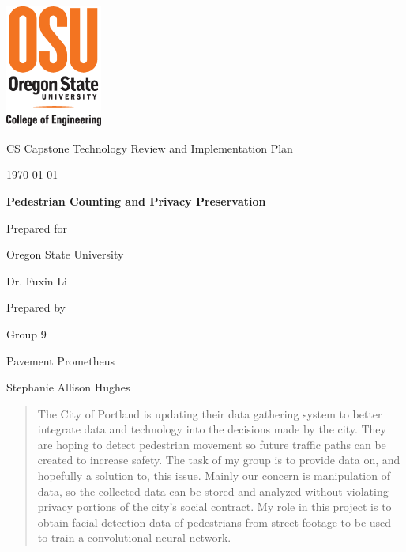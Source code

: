 \documentclass[onecolumn, draftclsnofoot,10pt, compsoc]{IEEEtran}
\def \CapstoneTeamName{		Pavement Prometheus}
\def \CapstoneTeamNumber{		9}
\def \GroupMemberOne{		Stephanie Allison Hughes }
\def \CapstoneProjectName{		Pedestrian Counting and Privacy Preservation}
\def \CapstoneSponsorCompany{	Oregon State University}
\def \CapstoneSponsorPerson{		Dr. Fuxin Li}
\def \DocType{		%
				Technology Review and Implementation Plan
				}
\newcommand{\NameSigPair}[1]{\par
\makebox[2.75in][r]{#1} \hfil 	\makebox[3.25in]{\makebox[2.25in]{\hrulefill} \hfill		\makebox[.75in]{\hrulefill}}
\par\vspace{-12pt} \textit{\tiny\noindent
\makebox[2.75in]{} \hfil		\makebox[3.25in]{\makebox[2.25in][r]{Signature} \hfill	\makebox[.75in][r]{Date}}}}
\renewcommand{\NameSigPair}[1]{#1}
\begin{document}
\begin{titlepage}
    \begin{singlespace}
    	\includegraphics[height=4cm]{images/coe_v_spot1}
        \hfill 
        \par\vspace{.2in}
        \centering
        \scshape{
            \huge CS Capstone \DocType \par
            {\large\today}\par
            \vspace{.5in}
            \textbf{\Huge\CapstoneProjectName}\par
            {\large Prepared for}\par
            \Huge \CapstoneSponsorCompany\par
            \vspace{5pt}
            {\Large\NameSigPair{\CapstoneSponsorPerson}\par}
            {\large Prepared by }\par
            Group\CapstoneTeamNumber\par
            \CapstoneTeamName\par 
            \vspace{5pt}
            {\Large
                \NameSigPair{\GroupMemberOne}\par
            }
            \vspace{20pt}
        }
        \begin{abstract}
        The City of Portland is updating their data gathering system to better integrate data and technology into the decisions made by the city. They are hoping to detect pedestrian movement so future traffic paths can be created to increase safety. The task of my group is to provide data on, and hopefully a solution to, this issue. Mainly our concern is manipulation of data, so the collected data can be stored and analyzed without violating privacy portions of the city's social contract. My role in this project is to obtain facial detection data of pedestrians from street footage to be used to train a convolutional neural network. 
        \end{abstract}     
    \end{singlespace}
\end{titlepage}
\newpage
{}
\tableofcontents
\clearpage
\end{document}
